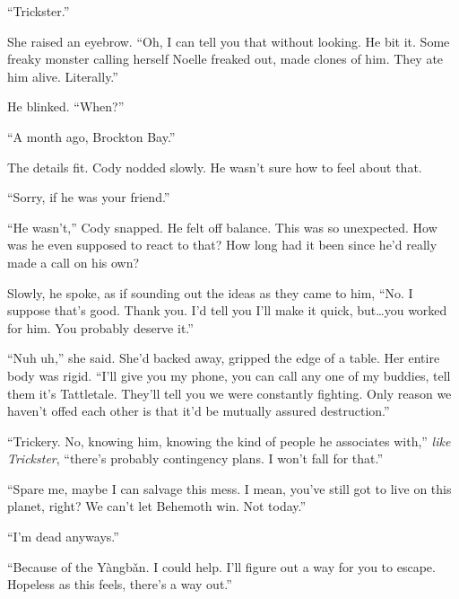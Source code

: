 ``Trickster.''



She raised an eyebrow.  ``Oh, I can tell you that without looking.  He bit it.  Some freaky monster calling herself Noelle freaked out, made clones of him.  They ate him alive.  Literally.''



He blinked.  ``When?''



``A month ago, Brockton Bay.''



The details fit.  Cody nodded slowly.  He wasn't sure how to feel about that.



``Sorry, if he was your friend.''



``He wasn't,'' Cody snapped.  He felt off balance.  This was so unexpected.  How was he even supposed to react to that?  How long had it been since he'd really made a call on his own?



Slowly, he spoke, as if sounding out the ideas as they came to him, ``No.  I suppose that's good.  Thank you.  I'd tell you I'll make it quick, but\ldots you worked for him.  You probably deserve it.''



``Nuh uh,'' she said.  She'd backed away, gripped the edge of a table.  Her entire body was rigid.  ``I'll give you my phone, you can call any one of my buddies, tell them it's Tattletale.  They'll tell you we were constantly fighting. Only reason we haven't offed each other is that it'd be mutually assured destruction.''



``Trickery.  No, knowing him, knowing the kind of people he associates with,'' \emph{like Trickster}, ``there's probably contingency plans.  I won't fall for that.''



``Spare me, maybe I can salvage this mess.  I mean, you've still got to live on this planet, right?  We can't let Behemoth win.  Not today.''



``I'm dead anyways.''



``Because of the Y\`{a}ngb\v{a}n.  I could help.  I'll figure out a way for you to escape.  Hopeless as this feels, there's a way out.''



